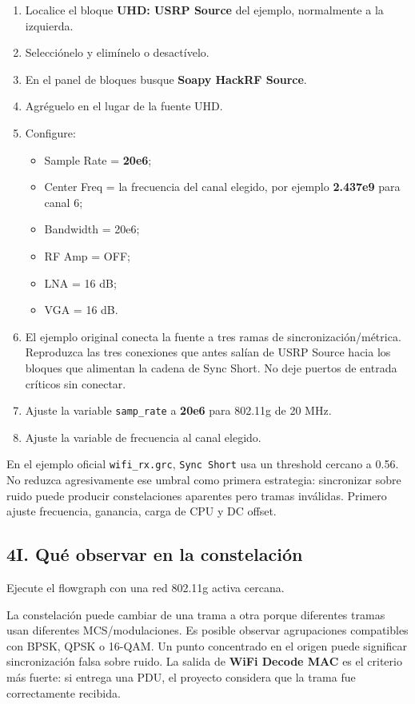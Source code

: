\begin{enumerate}
    \item Localice el bloque \textbf{UHD: USRP Source} del ejemplo, normalmente a la izquierda.
    \item Selecciónelo y elimínelo o desactívelo.
    \item En el panel de bloques busque \textbf{Soapy HackRF Source}.
    \item Agréguelo en el lugar de la fuente UHD.
    \item Configure:
    \begin{itemize}
        \item Sample Rate = \textbf{20e6};
        \item Center Freq = la frecuencia del canal elegido, por ejemplo \textbf{2.437e9} para canal 6;
        \item Bandwidth = 20e6;
        \item RF Amp = OFF;
        \item LNA = 16 dB;
        \item VGA = 16 dB.
    \end{itemize}
    \item El ejemplo original conecta la fuente a tres ramas de sincronización/métrica. Reproduzca las tres conexiones que antes salían de USRP Source hacia los bloques que alimentan la cadena de Sync Short. No deje puertos de entrada críticos sin conectar.
    \item Ajuste la variable \texttt{samp\_rate} a \textbf{20e6} para 802.11g de 20 MHz.
    \item Ajuste la variable de frecuencia al canal elegido.
\end{enumerate}

\begin{nota}
En el ejemplo oficial \texttt{wifi\_rx.grc}, \texttt{Sync Short} usa un threshold cercano a 0.56. No reduzca agresivamente ese umbral como primera estrategia: sincronizar sobre ruido puede producir constelaciones aparentes pero tramas inválidas. Primero ajuste frecuencia, ganancia, carga de CPU y DC offset.
\end{nota}

\subsection{4I. Qué observar en la constelación}

Ejecute el flowgraph con una red 802.11g activa cercana.

\begin{esperado}
La constelación puede cambiar de una trama a otra porque diferentes tramas usan diferentes MCS/modulaciones. Es posible observar agrupaciones compatibles con BPSK, QPSK o 16-QAM. Un punto concentrado en el origen puede significar sincronización falsa sobre ruido. La salida de \textbf{WiFi Decode MAC} es el criterio más fuerte: si entrega una PDU, el proyecto considera que la trama fue correctamente recibida.
\end{esperado}


